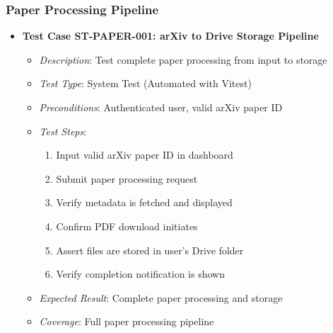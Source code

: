 \documentclass[12pt]{article}
\begin{document}
\subsubsection{Paper Processing Pipeline}
\begin{itemize}
  \item \textbf{Test Case ST-PAPER-001: arXiv to Drive Storage Pipeline}
    \begin{itemize}
      \item \textit{Description}: Test complete paper processing from input to storage
      \item \textit{Test Type}: System Test (Automated with Vitest)
      \item \textit{Preconditions}: Authenticated user, valid arXiv paper ID
      \item \textit{Test Steps}:
        \begin{enumerate}
          \item Input valid arXiv paper ID in dashboard
          \item Submit paper processing request
          \item Verify metadata is fetched and displayed
          \item Confirm PDF download initiates
          \item Assert files are stored in user's Drive folder
          \item Verify completion notification is shown
        \end{enumerate}
      \item \textit{Expected Result}: Complete paper processing and storage
      \item \textit{Coverage}: Full paper processing pipeline
    \end{itemize}


\end{itemize}
\end{document}

